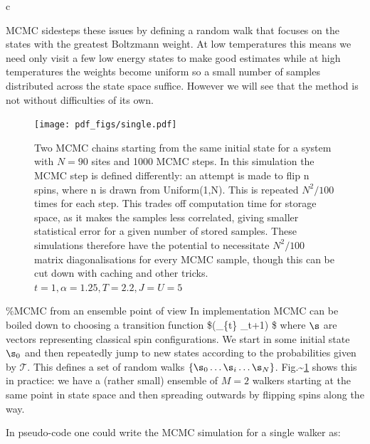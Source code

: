 c

MCMC sidesteps these issues by defining a random walk that focuses on the states with the greatest Boltzmann weight. At low temperatures this means we need only visit a few low energy states to make good estimates while at high temperatures the weights become uniform so a small number of samples distributed across the state space suffice. However we will see that the method is not without difficulties of its own.

\begin{figure}
  \centering
  \texttt{[image: pdf\_figs/single.pdf]}
  \caption{Two MCMC chains starting from the same initial state for a system with $N = 90$ sites and 1000 MCMC steps.  In this simulation the MCMC step is defined differently: an attempt is made to flip n spins, where n is drawn from Uniform(1,N). This is repeated $N^2/100$ times for each step. This trades off computation time for storage space, as it makes the samples less correlated, giving smaller statistical error for a given number of stored samples. These simulations therefore have the potential to necessitate $N^2/100$ matrix diagonalisations for every MCMC sample, though this can be cut down with caching and other tricks. $t = 1, \alpha = 1.25, T = 2.2, J = U = 5 $ \label{fig:single}}
\end{figure}

\%MCMC from an ensemble point of view In implementation \ac{MCMC} can be boiled down to choosing a transition function \$(\s\_\{t\} \rightarrow \s\_t+1) \$ where \(\s\) are vectors representing classical spin configurations. We start in some initial state \(\s_0\) and then repeatedly jump to new states according to the probabilities given by \(\mathcal{T}\). This defines a set of random walks \(\{\s_0\ldots \s_i\ldots \s_N\}\). Fig.\textasciitilde{}\ref{fig:single} shows this in practice: we have a (rather small) ensemble of \(M = 2\) walkers starting at the same point in state space and then spreading outwards by flipping spins along the way.

In pseudo-code one could write the MCMC simulation for a single walker as:

\begin{Shaded}
\begin{Highlighting}[]
\OperatorTok{=}

 
\OperatorTok{=}
\OperatorTok{=}
\end{Highlighting}
\end{Shaded}

